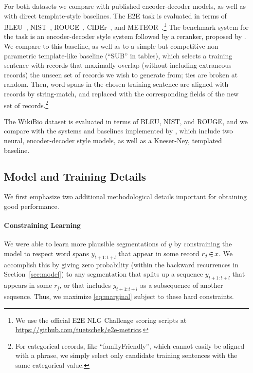 \documentclass[11pt,a4paper]{article}
\begin{document}
For both datasets we compare with published encoder-decoder models, as well as with direct template-style baselines. %
The E2E task is evaluated in terms of BLEU~\citep{papineni02bleu}, NIST~\citep{belz2006comparing}, ROUGE~\citep{lin2004rouge}, CIDEr~\citep{vedantam2015cider}, and METEOR~\citep{banerjee2005meteor}.\footnote{We use the official E2E NLG Challenge scoring scripts at \url{https://github.com/tuetschek/e2e-metrics}.} The benchmark system for the task is an encoder-decoder style system followed by a reranker, proposed by \citet{duvsek2016sequence}. We compare to this baseline, as well as to a simple but competitive non-parametric template-like baseline (``SUB'' in tables), which selects a training sentence with records that maximally overlap (without including extraneous records) the unseen set of records we wish to generate from; ties are broken at random. Then, word-spans in the chosen training sentence are aligned with records by string-match, and replaced with the corresponding fields of the new set of records.\footnote{For categorical records, like ``familyFriendly'', which cannot easily be aligned with a phrase, we simply select only candidate training sentences with the same categorical value.}

The WikiBio dataset is evaluated in terms of BLEU, NIST, and ROUGE, and we compare with the systems and baselines implemented by \citet{lebret2016neural}, which include two neural, encoder-decoder style models, as well as a Kneser-Ney, templated baseline.

\subsection{Model and Training Details}
\label{sec:details}
We first emphasize two additional methodological details important for obtaining good performance.

\vspace{-0.1cm}
\paragraph{Constraining Learning}
We were able to learn more plausible segmentations of $y$ by constraining the model to respect word spans $y_{t+1:t+l}$ that appear in some record $r_j \, {\in} \, x$. We accomplish this by giving zero probability (within the backward recurrences in Section~\ref{sec:model}) to any segmentation that splits up a sequence $y_{t+1:t+l}$ that appears in some $r_j$, or that includes $y_{t+1:t+l}$ as a subsequence of another sequence. Thus, we maximize \eqref{eq:marginal} subject to these hard constraints.
\end{document}
